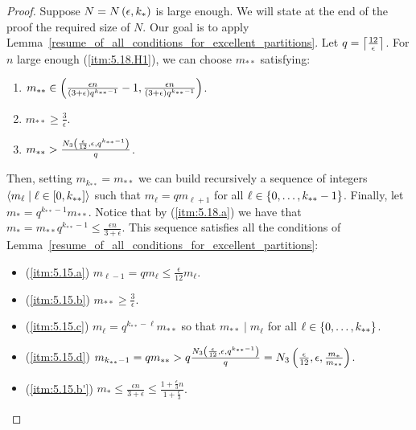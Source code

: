         \begin{proof}
            Suppose $N = N\left( \epsilon, k_* \right)$ is large enough.
            We will state at the end of the proof the required size of $N$.
            Our goal is to apply Lemma~\ref{resume_of_all_conditions_for_excellent_partitions}.
            Let $q = \left\lceil \frac{12}{\epsilon} \right\rceil$.
            For $n$ large enough (\ref{itm:5.18.H1}), we can choose $m_{**}$ satisfying:
            \begin{enumerate}[label=(\alph*), ref=\alph*]
                \item \label{itm:5.18.a} $m_{**} \in \left( \frac{\epsilon n}{\left( 3 + \epsilon \right) q^{k_{**}-1}} - 1,
                    \frac{\epsilon n}{\left( 3 + \epsilon \right) q^{k_{**}-1}} \right)$.
                \item \label{itm:5.18.b} $m_{**} \geq \frac{3}{\epsilon}$.
                \item \label{itm:5.18.c} $m_{**} > \frac{N_3\left( \frac{\epsilon}{12}, \epsilon, q^{k_{**}-1} \right)}{q}$.
            \end{enumerate}
            Then, setting $m_{k_{**}} = m_{**}$ we can build recursively a sequence of integers
            $\left< m_\ell \mid \ell \in [0, k_{**}] \right>$ such that $m_\ell = q m_{\ell + 1}$ for all
            $\ell \in \left\{ 0, \dots, k_{**}-1 \right\}$.
            Finally, let $m_* = q^{k_{**}-1} m_{**}$.
            Notice that by (\ref{itm:5.18.a}) we have that $m_* = m_{**} q^{k_{**}-1} \leq \frac{\epsilon n}{3 + \epsilon}$.
            This sequence satisfies all the conditions of Lemma~\ref{resume_of_all_conditions_for_excellent_partitions}:
            \begin{itemize}[label={}]
                \item (\ref{itm:5.15.a}) $m_{\ell-1} = q m_\ell \leq \frac{\epsilon}{12} m_\ell$.
                \item (\ref{itm:5.15.b}) $m_{**} \geq \frac{3}{\epsilon}$.
                \item (\ref{itm:5.15.c}) $m_\ell = q^{k_{**}-\ell} m_{**}$ so that $m_{**} \mid m_\ell$ for all $\ell \in \left\{ 0, \dots, k_{**} \right\}$.
                \item (\ref{itm:5.15.d}) $m_{k_{**}-1} = q m_{**} > q \frac{N_3\left( \frac{\epsilon}{12}, \epsilon, q^{k_{**}-1} \right)}{q}
                    = N_3\left( \frac{\epsilon}{12}, \epsilon, \frac{m_*}{m_{**}} \right)$.
                \item (\ref{itm:5.15.b'}) $m_* \leq \frac{\epsilon n}{3 + \epsilon} \leq \frac{1 + \frac{\epsilon}{3}n}{1 + \frac{\epsilon}{3}}$.

\end{itemize}
\end{proof}

